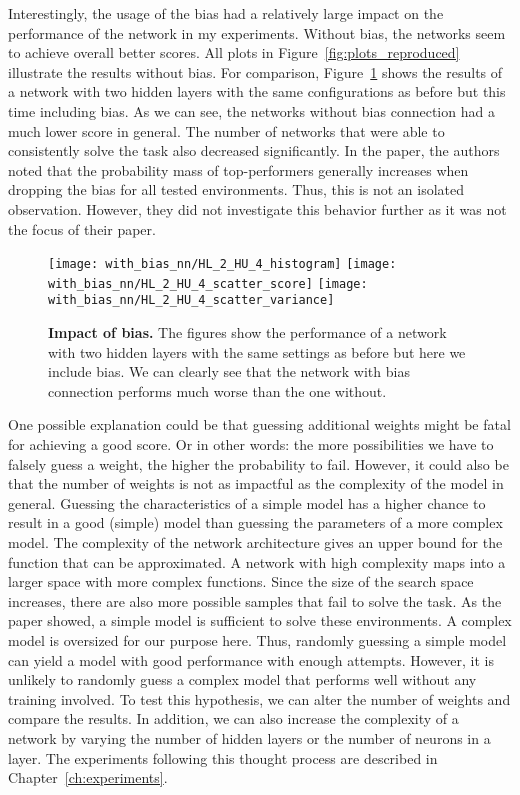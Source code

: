 Interestingly, the usage of the bias had a relatively large impact on the performance of the network in my experiments. Without bias, the networks seem to achieve overall better scores. All plots in Figure~\ref{fig:plots_reproduced} illustrate the results without bias. For comparison, Figure~\ref{fig:comparison_bias} shows the results of a network with two hidden layers with the same configurations as before but this time including bias. As we can see, the networks without bias connection had a much lower score in general. The number of networks that were able to consistently solve the task also decreased significantly. In the paper, the authors noted that the probability mass of top-performers generally increases when dropping the bias for all tested environments. Thus, this is not an isolated observation. However, they did not investigate this behavior further as it was not the focus of their paper.
\begin{figure}[ht]
\centering
\texttt{[image: with\_bias\_nn/HL\_2\_HU\_4\_histogram]}
\texttt{[image: with\_bias\_nn/HL\_2\_HU\_4\_scatter\_score]}
\texttt{[image: with\_bias\_nn/HL\_2\_HU\_4\_scatter\_variance]}
\caption[Impact of Bias]{
  \textbf{Impact of bias.}
  The figures show the performance of a network with two hidden layers with the same settings as before but here we include bias. We can clearly see that the network with bias connection performs much worse than the one without.
}
\label{fig:comparison_bias}
\end{figure}
One possible explanation could be that guessing additional weights might be fatal for achieving a good score. Or in other words: the more possibilities we have to falsely guess a weight, the higher the probability to fail. However, it could also be that the number of weights is not as impactful as the complexity of the model in general. Guessing the characteristics of a simple model has a higher chance to result in a good (simple) model than guessing the parameters of a more complex model. The complexity of the network architecture gives an upper bound for the function that can be approximated. A network with high complexity maps into a larger space with more complex functions. Since the size of the search space increases, there are also more possible samples that fail to solve the task. As the paper showed, a simple model is sufficient to solve these environments. A complex model is oversized for our purpose here. Thus, randomly guessing a simple model can yield a model with good performance with enough attempts. However, it is unlikely to randomly guess a complex model that performs well without any training involved. To test this hypothesis, we can alter the number of weights and compare the results. In addition, we can also increase the complexity of a network by varying the number of hidden layers or the number of neurons in a layer. The experiments following this thought process are described in Chapter~\ref{ch:experiments}.


